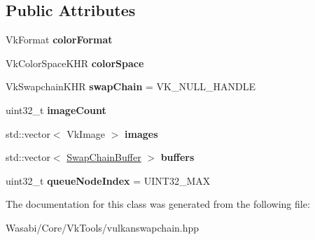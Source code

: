 \subsection*{Public Attributes}
\begin{DoxyCompactItemize}
\item 
Vk\+Format {\bfseries color\+Format}\hypertarget{class_vulkan_swap_chain_a67c1219bd550a82d8cb94a5fe8c189cc}{}\label{class_vulkan_swap_chain_a67c1219bd550a82d8cb94a5fe8c189cc}

\item 
Vk\+Color\+Space\+K\+HR {\bfseries color\+Space}\hypertarget{class_vulkan_swap_chain_ae7aec66b6c7a72081b6defe06383d88f}{}\label{class_vulkan_swap_chain_ae7aec66b6c7a72081b6defe06383d88f}

\item 
Vk\+Swapchain\+K\+HR {\bfseries swap\+Chain} = V\+K\+\_\+\+N\+U\+L\+L\+\_\+\+H\+A\+N\+D\+LE\hypertarget{class_vulkan_swap_chain_ab9eb0e406ca010d740847d5fd90bdf02}{}\label{class_vulkan_swap_chain_ab9eb0e406ca010d740847d5fd90bdf02}

\item 
uint32\+\_\+t {\bfseries image\+Count}\hypertarget{class_vulkan_swap_chain_a3a6ffe74c367bbb6f8683619b1fd6757}{}\label{class_vulkan_swap_chain_a3a6ffe74c367bbb6f8683619b1fd6757}

\item 
std\+::vector$<$ Vk\+Image $>$ {\bfseries images}\hypertarget{class_vulkan_swap_chain_a79b371e0ed500864e9ff9e4ff245c44a}{}\label{class_vulkan_swap_chain_a79b371e0ed500864e9ff9e4ff245c44a}

\item 
std\+::vector$<$ \hyperlink{struct___swap_chain_buffers}{Swap\+Chain\+Buffer} $>$ {\bfseries buffers}\hypertarget{class_vulkan_swap_chain_a504a481b9d1626c8c25306a444008dd6}{}\label{class_vulkan_swap_chain_a504a481b9d1626c8c25306a444008dd6}

\item 
uint32\+\_\+t {\bfseries queue\+Node\+Index} = U\+I\+N\+T32\+\_\+\+M\+AX\hypertarget{class_vulkan_swap_chain_ad6e55f6eb29fea2492240165f8dc0424}{}\label{class_vulkan_swap_chain_ad6e55f6eb29fea2492240165f8dc0424}

\end{DoxyCompactItemize}


The documentation for this class was generated from the following file\+:\begin{DoxyCompactItemize}
\item 
Wasabi/\+Core/\+Vk\+Tools/vulkanswapchain.\+hpp\end{DoxyCompactItemize}
